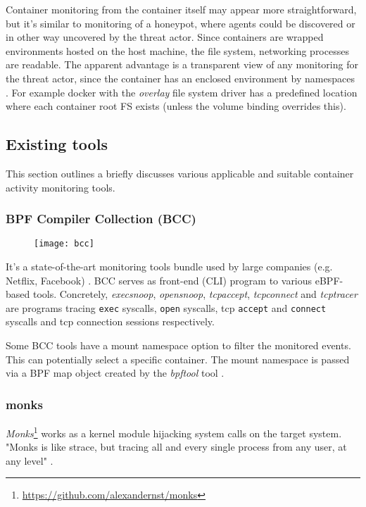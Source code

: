 Container monitoring from the container itself may appear more straightforward, but it's similar to monitoring of a honeypot, where agents could be discovered or in other way uncovered by the threat actor. Since containers are wrapped environments hosted on the host machine, the file system, networking processes are readable. The apparent advantage is a transparent view of any monitoring for the threat actor, since the container has an enclosed environment by namespaces \cite{blog:containers}. For example docker with the \textit{overlay} file system driver has a predefined location where each container root FS exists (unless the volume binding overrides this).

\subsection{Existing tools \label{anal:mon:exist}}
This section outlines a briefly discusses various applicable and suitable container activity monitoring tools.

\subsubsection*{BPF Compiler Collection (BCC)}
\begin{figure}[h]
	\centering
	\texttt{[image: bcc]}
	\caption{}
	\label{image:anal:mon:bcc}
\end{figure}
It's a state-of-the-art monitoring tools bundle used by large companies (e.g. Netflix, Facebook) \cite{blog:bcc}. BCC serves as front-end (CLI) program to various eBPF-based tools. Concretely, \textit{execsnoop}, \textit{opensnoop}, \textit{tcpaccept}, \textit{tcpconnect} and \textit{tcptracer} are programs tracing \texttt{exec} syscalls, \texttt{open} syscalls, tcp \texttt{accept} and \texttt{connect} syscalls and tcp connection sessions respectively.

Some BCC tools have a mount namespace option to filter the monitored events. This can potentially select a specific container. The mount namespace is passed via a BPF map object created by the \textit{bpftool} tool \cite{git:bcc:mntns}.

\subsubsection*{monks}
\textit{Monks}\footnote{\url{https://github.com/alexandernst/monks}} works as a kernel module hijacking system calls on the target system. "Monks is like strace, but tracing all and every single process from any user, at any level" \cite{git:monks}.

